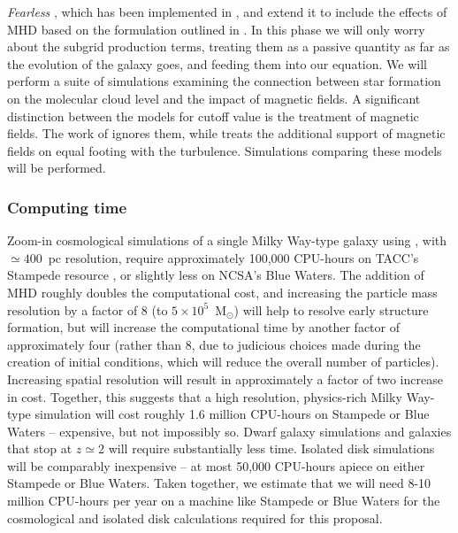{\emph{Fearless}  \citep{Maier09}, which has been implemented in \enzo, and extend
it to include the effects of MHD based on the formulation outlined in
\citep{Chernyshov14}.  In this phase we will only worry about the subgrid
production terms, treating them as a passive quantity as far as the evolution of
the galaxy goes, and feeding them into our equation.
We 
will perform a suite of simulations examining the connection between star
formation on the molecular cloud level and the impact of magnetic fields.  A
significant distinction between the models for cutoff value is the treatment of
magnetic fields.  The work of \citet{Krumholz05} ignores them, while
\citet{Padoan11} treats the additional support of magnetic fields on equal
footing with the turbulence.  Simulations comparing these models will be
performed.
}

\vspace{-3mm}
\subsubsection{Computing time}
\label{sec:comptime_sims}
\vspace{-2mm}

Zoom-in cosmological simulations of a single Milky Way-type galaxy
using \enzo, with $\simeq 400$~pc resolution, require approximately
100,000 CPU-hours on TACC's Stampede resource
\cite{2012ApJ...749..140H,2012ApJ...759..137J,2013MNRAS.430.1548H}, or
slightly less on NCSA's Blue Waters.  The addition of MHD roughly
doubles the computational cost, and increasing the particle mass
resolution by a factor of 8 (to $5 \times 10^5$~M$_\odot$) will help
to resolve early structure formation, but will increase the
computational time by another factor of approximately four (rather
than 8, due to judicious choices made during the creation of initial
conditions, which will reduce the overall number of particles).
Increasing spatial resolution will result in approximately a factor of
two increase in cost.  Together, this suggests that a high resolution,
physics-rich Milky Way-type simulation will cost roughly 1.6 million
CPU-hours on Stampede or Blue Waters -- expensive, but not impossibly
so.  Dwarf galaxy simulations and galaxies that stop at $z \simeq 2$
will require substantially less time.  Isolated disk simulations will
be comparably inexpensive -- at most 50,000 CPU-hours apiece on either
Stampede or Blue Waters.  Taken together, we estimate that we will
need 8-10 million CPU-hours per year on a machine like Stampede or
Blue Waters for the cosmological and isolated disk calculations
required for this proposal.

